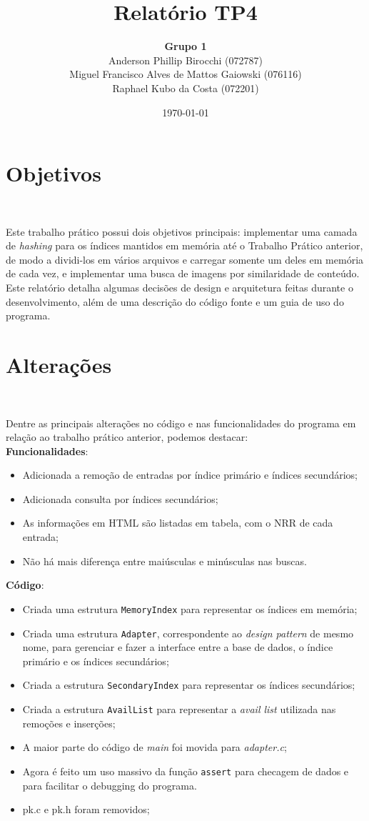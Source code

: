 \documentclass{article}
\title{\textbf{Relatório TP4}}
\author{\textbf{Grupo 1} \\
  Anderson Phillip Birocchi (072787) \\
  Miguel Francisco Alves de Mattos Gaiowski (076116) \\
  Raphael Kubo da Costa (072201)}
\date{\today}
\begin{document}
\maketitle

\section{Objetivos}\

Este trabalho prático possui dois objetivos principais: implementar uma camada de \textit{hashing} para os índices mantidos em memória até o Trabalho Prático anterior, de modo a dividi-los em vários arquivos e carregar somente um deles em memória de cada vez, e implementar uma busca de imagens por similaridade de conteúdo.\\

Este relatório detalha algumas decisões de design e arquitetura feitas durante o desenvolvimento, além de uma descrição do código fonte e um guia de uso do programa.

\section{Alterações}\

Dentre as principais alterações no código e nas funcionalidades do programa em relação ao trabalho prático anterior, podemos destacar:\\

\textbf{Funcionalidades}:
\begin{itemize}
\item Adicionada a remoção de entradas por índice primário e índices secundários;
\item Adicionada consulta por índices secundários;
\item As informações em HTML são listadas em tabela, com o NRR de cada entrada;
\item Não há mais diferença entre maiúsculas e minúsculas nas buscas.
\end{itemize}

\textbf{Código}:
\begin{itemize}
\item Criada uma estrutura \texttt{MemoryIndex} para representar os índices em memória;
\item Criada uma estrutura \texttt{Adapter}, correspondente ao \textit{design pattern} de mesmo nome, para gerenciar e fazer a interface entre a base de dados, o índice primário e os índices secundários;
\item Criada a estrutura \texttt{SecondaryIndex} para representar os índices secundários;
\item Criada a estrutura \texttt{AvailList} para representar a \textit{avail list} utilizada nas remoções e inserções;
\item A maior parte do código de \textit{main} foi movida para \textit{adapter.c};
\item Agora é feito um uso massivo da função \texttt{assert} para checagem de dados e para facilitar o debugging do programa.
\item pk.c e pk.h foram removidos;
\end{itemize}
\end{document}
